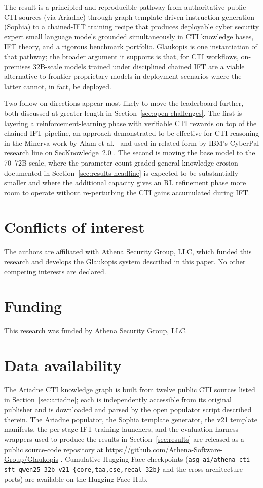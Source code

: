 \documentclass[webpdf,contemporary,large]{oup-authoring-template}
\providecommand{\hfid}[1]{{\small\nolinkurl{#1}}}
\theoremstyle{thmstyleone}
\theoremstyle{thmstyletwo}
\theoremstyle{thmstylethree}
\begin{document}
The result is a principled and reproducible pathway from authoritative public CTI sources (via Ariadne) through graph-template-driven instruction generation (Sophia) to a chained-IFT training recipe that produces deployable cyber security expert small language models grounded simultaneously in CTI knowledge bases, IFT theory, and a rigorous benchmark portfolio. Glaukopis is one instantiation of that pathway; the broader argument it supports is that, for CTI workflows, on-premises 32B-scale models trained under disciplined chained IFT are a viable alternative to frontier proprietary models in deployment scenarios where the latter cannot, in fact, be deployed.

Two follow-on directions appear most likely to move the leaderboard further, both discussed at greater length in Section~\ref{sec:open-challenges}. The first is layering a reinforcement-learning phase with verifiable CTI rewards on top of the chained-IFT pipeline, an approach demonstrated to be effective for CTI reasoning in the Minerva work by Alam et al.\ \cite{alam2026minerva} and used in related form by IBM's CyberPal research line on SecKnowledge~2.0 \cite{levi2025toward}. The second is moving the base model to the 70--72B scale, where the parameter-count-graded general-knowledge erosion documented in Section~\ref{sec:results-headline} is expected to be substantially smaller and where the additional capacity gives an RL refinement phase more room to operate without re-perturbing the CTI gains accumulated during IFT.


\section{Conflicts of interest}
The authors are affiliated with Athena Security Group, LLC, which funded this research and develops the Glaukopis system described in this paper. No other competing interests are declared.

\section{Funding}
This research was funded by Athena Security Group, LLC.

\section{Data availability}
The Ariadne CTI knowledge graph is built from twelve public CTI sources listed in Section~\ref{sec:ariadne}; each is independently accessible from its original publisher and is downloaded and parsed by the open populator script described therein. The Ariadne populator, the Sophia template generator, the v21 template manifests, the per-stage IFT training launchers, and the evaluation-harness wrappers used to produce the results in Section~\ref{sec:results} are released as a public source-code repository at \url{https://github.com/Athena-Software-Group/Glaukopis} \cite{glaukopis2026repo}. Cumulative Hugging Face checkpoints (\hfid{asg-ai/athena-cti-sft-qwen25-32b-v21-\{core,taa,cse,recal-32b\}} and the cross-architecture ports) are available on the Hugging Face Hub.
\end{document}
